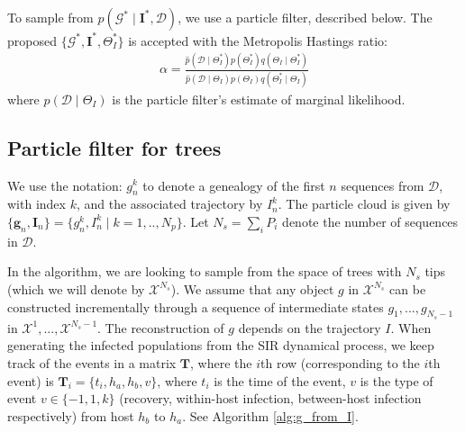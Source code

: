 \documentclass[a4paper,18pt]{report}
\begin{document}
To sample from $p(\mathcal{G}^* \mid \mathbf{I}^*, \mathcal{D})$, we use a particle filter, described below. The proposed $\{\mathcal{G}^*, \mathbf{I}^* , \Theta_I^*\}$ is accepted 
with the Metropolis Hastings ratio:
\begin{eqnarray}
\alpha = \frac{\hat{p}(\mathcal{D} \mid \Theta_I^*)p(\Theta_I^*)q(\Theta_I\mid \Theta_I^*)}{\hat{p}(\mathcal{D} \mid \Theta_I)p(\Theta_I)q(\Theta_I^*\mid \Theta_I) }
\end{eqnarray}
where $\hat{p}(\mathcal{D} \mid \Theta_I)$ is the particle filter's estimate of marginal likelihood. 

\subsection{Particle filter for trees}
We use the notation: $g_n^k$ to denote a genealogy of the first $n$ sequences from $\mathcal{D}$, with index $k$, and the associated trajectory by $I_n^k$. The particle cloud is
given by $\{\mathbf{g}_n, \mathbf{I}_n\}=\{g_n^k,  I_n^k \mid k=1,..,N_p\}$. Let $N_s = \sum_i P_i$ denote the number of sequences in $\mathcal{D}$. 

In the algorithm, we are looking to sample from the space of trees with $N_s$ tips (which we will denote by $\mathcal{X}^{N_s}$). We assume that any object $g$ in $\mathcal{X}^{N_s}$ can 
be constructed incrementally through a sequence of intermediate states   ${g}_1,..., {g}_{N_s-1}$ in  $\mathcal{X}^{1}, ..., \mathcal{X}^{N_s -1}$. The reconstruction of $g$ depends on the
trajectory $I$. When generating the infected populations from the SIR dynamical process, we keep track of the events in a matrix $\mathbf{T}$, where the $i$th row (corresponding to the $i$th event) is $\mathbf{T}_i=\{t_i, h_a, h_b, v\}$, where $t_i$ is the time of the event, $v$ is the type of event $v \in \{-1,1, k\}$ (recovery, within-host infection, between-host infection respectively) from host $h_b$ to $h_a$. See Algorithm \ref{alg:g_from_I}.
\end{document}
